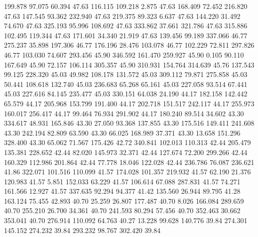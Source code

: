  199.878   97.075   60.394        47.63
 116.115  109.218    2.875        47.63
 168.409   72.452  216.820        47.63
 147.545   93.362  232.940        47.63
 219.375   89.323    6.637        47.63
 144.220   31.492   74.670        47.63
 325.193   95.996  108.692        47.63
 333.862   37.661  321.786        47.63
 315.886  102.495  119.344        47.63
 171.601   34.340   21.919        47.63
 139.456   99.189  337.066        46.77
 275.237   35.898  197.306        46.77
 176.196   28.476  103.078        46.77
 102.229   72.811  297.826        46.77
 103.030   74.607  293.456        45.90
 346.592  161.470  259.927        45.90
   0.105   90.110  167.649        45.90
  72.157  106.114  305.357        45.90
 310.931  154.764  314.639        45.76
 137.543   99.125  228.320        45.03
  49.982  108.178  131.572        45.03
 309.112   79.871  275.858        45.03
  50.441  108.618  132.740        45.03
 236.683   65.268   65.161        45.03
 227.058   93.514   67.441        45.03
 227.616   84.145  235.477        45.03
 330.151   64.038   24.190        44.17
 182.158  142.442   65.579        44.17
 205.968  153.799  191.400        44.17
 202.718  151.517  242.117        44.17
 255.973  160.017  256.417        44.17
  99.464   76.934  291.902        44.17
 180.240   89.514   34.602        43.30
 334.617   48.931  165.846        43.30
  27.050   93.368  137.855        43.30
 175.516  149.411  241.608        43.30
 242.194   82.809   63.590        43.30
  66.025  168.989   37.371        43.30
  13.658  151.296  328.400        43.30
  65.062   71.567  175.426        42.72
 340.841  102.013  110.313        42.44
 205.479  135.381  228.652        42.44
  82.020  145.973   32.371        42.44
 127.674   72.200  299.266        42.44
 160.329  112.986  201.864        42.44
  77.778   18.046  122.028        42.44
 236.786   76.087  236.621        41.86
 322.071  101.516  110.099        41.57
 174.028  101.357  219.932        41.57
  62.190   21.376  120.983        41.57
   5.851  152.033   63.229        41.57
 106.614   67.088  287.831        41.57
  74.271  161.566   12.927        41.57
 337.635   92.294   94.377        41.42
 135.560   26.944   89.795        41.28
 163.124   75.455   42.893        40.70
  25.259   26.807  177.487        40.70
   8.026  166.084  289.659        40.70
 255.210   26.700   34.361        40.70
 241.593   80.294   57.456        40.70
 352.463   30.662  353.041        40.70
 276.914  110.092   64.763        40.27
  13.228   99.628  140.776        39.84
 274.301  145.152  274.232        39.84
 293.232   98.767  302.420        39.84
